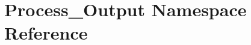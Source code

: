 \hypertarget{namespaceProcess__Output}{\section{Process\-\_\-\-Output Namespace Reference}
\label{namespaceProcess__Output}
}
